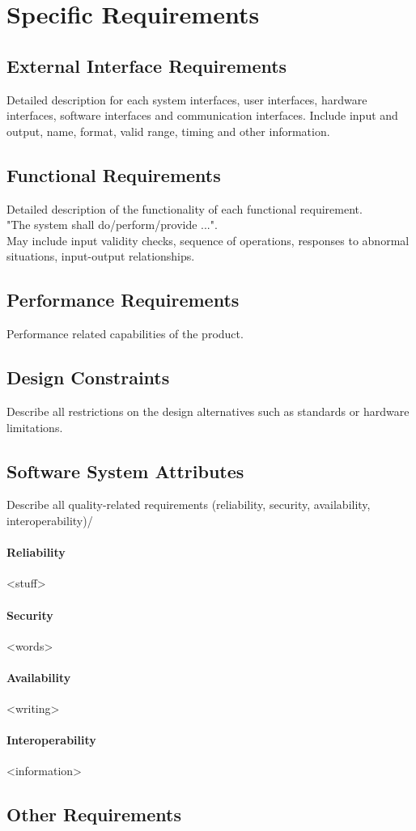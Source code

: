 \section{Specific Requirements}
	\subsection{External Interface Requirements}
	Detailed description for each system interfaces, user interfaces, hardware interfaces, software interfaces and communication interfaces. Include input and output, name, format, valid range, timing and other information.
	
	\subsection{Functional Requirements}
	Detailed description of the functionality of each functional requirement.\\
	"The system shall do/perform/provide ...".\\
	May include input validity checks, sequence of operations, responses to abnormal situations, input-output relationships.
	
	\subsection{Performance Requirements}
	Performance related capabilities of the product.
		
	\subsection{Design Constraints}
	Describe all restrictions on the design alternatives such as standards or hardware limitations.	
	
	\subsection{Software System Attributes}
Describe all quality-related requirements (reliability, security, availability, interoperability)/
	\paragraph{Reliability}
	<stuff>
	\paragraph{Security}
	<words>
	\paragraph{Availability}
	<writing>
	\paragraph{Interoperability}
	<information>
	
	\subsection{Other Requirements}
	